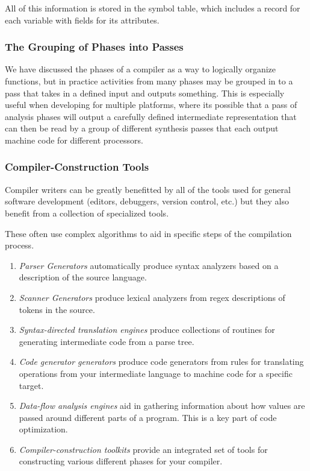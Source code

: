 \documentclass[titlepage]{article}
\begin{document}
All of this information is stored in the symbol table, which includes a record for each variable with fields for its attributes.

\subsubsection*{The Grouping of Phases into Passes}
We have discussed the phases of a compiler as a way to logically organize functions, but in practice activities from many phases may be grouped in to a pass that takes in a defined input and outputs something. This is especially useful when developing for multiple platforms, where its possible that a pass of analysis phases will output a carefully defined intermediate representation that can then be read by a group of different synthesis passes that each output machine code for different processors.

\subsubsection*{Compiler-Construction Tools}
Compiler writers can be greatly benefitted by all of the tools used for general software development (editors, debuggers, version control, etc.) but they also benefit from a collection of specialized tools.

These often use complex algorithms to aid in specific steps of the compilation process.

\begin{enumerate}
    \item \textit{Parser Generators} automatically produce syntax analyzers based on a description of the source language.
    \item \textit{Scanner Generators} produce lexical analyzers from regex descriptions of tokens in the source.
    \item \textit{Syntax-directed translation engines} produce collections of routines for generating intermediate code from a parse tree.
    \item \textit{Code generator generators} produce code generators from rules for translating operations from your intermediate language to machine code for a specific target.
    \item \textit{Data-flow analysis engines} aid in gathering information about how values are passed around different parts of a program. This is a key part of code optimization.
    \item \textit{Compiler-construction toolkits} provide an integrated set of tools for constructing various different phases for your compiler.
\end{enumerate}
\end{document}
